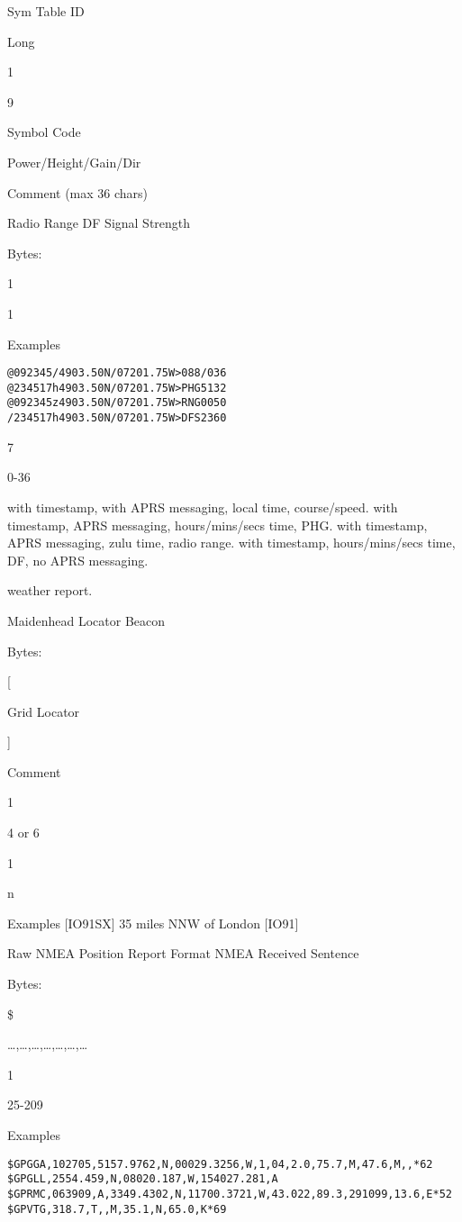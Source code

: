 Sym
Table
ID

Long

1

9

Symbol
Code

Power/Height/Gain/Dir

Comment
(max 36 chars)

Radio Range
DF Signal Strength

Bytes:

1

1

Examples
\begin{verbatim}
@092345/4903.50N/07201.75W>088/036
@234517h4903.50N/07201.75W>PHG5132
@092345z4903.50N/07201.75W>RNG0050
/234517h4903.50N/07201.75W>DFS2360
\end{verbatim}
7

0-36

with timestamp, with APRS messaging, local time,
course/speed.
with timestamp, APRS messaging, hours/mins/secs
time, PHG.
with timestamp, APRS messaging, zulu time, radio
range.
with timestamp, hours/mins/secs time, DF,
no APRS messaging.


weather report.

Maidenhead Locator Beacon

Bytes:

[

Grid Locator

]

Comment

1

4 or 6

1

n

Examples
[IO91SX] 35 miles NNW of London
[IO91]


Raw NMEA Position Report Format
NMEA Received Sentence

Bytes:

\$

…,…,…,…,…,…,…

1

25-209

Examples

\begin{verbatim}
$GPGGA,102705,5157.9762,N,00029.3256,W,1,04,2.0,75.7,M,47.6,M,,*62
$GPGLL,2554.459,N,08020.187,W,154027.281,A
$GPRMC,063909,A,3349.4302,N,11700.3721,W,43.022,89.3,291099,13.6,E*52
$GPVTG,318.7,T,,M,35.1,N,65.0,K*69
\end{verbatim}

